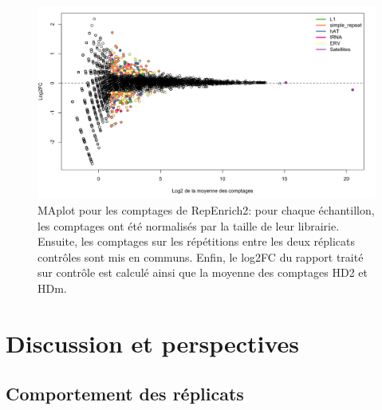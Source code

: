 \documentclass[a4paper,12pt,times]{report}
\newcommand{\scaption}[1]{\caption{\footnotesize{#1}}}
\begin{document}
     
\begin{figure}[!h]
\includegraphics [scale=0.35]{RepEnrich_PCA.png}
\scaption{MAplot  pour les comptages de RepEnrich2: pour chaque échantillon, les comptages ont été normalisés par la taille de leur librairie. Ensuite, les comptages sur les répétitions entre les deux réplicats contrôles sont mis en communs. Enfin, le log2FC du rapport traité sur contrôle est calculé ainsi que la moyenne des comptages HD2 et HDm.}
\label{Maplot}
\end{figure}


\newpage
\chapter*{{
\vspace*{-2cm}}Discussion et perspectives}
\setcounter{section}{0}


 
 \section {Comportement des réplicats}
\end{document}
